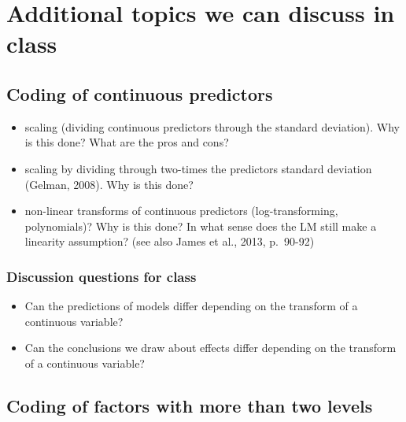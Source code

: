 \documentclass[
]{article}
\providecommand{\tightlist}{%
  \setlength{\itemsep}{0pt}\setlength{\parskip}{0pt}}
\begin{document}
\hypertarget{additional-topics-we-can-discuss-in-class}{%
\section{Additional topics we can discuss in
class}\label{additional-topics-we-can-discuss-in-class}}

\hypertarget{coding-of-continuous-predictors}{%
\subsection{Coding of continuous
predictors}\label{coding-of-continuous-predictors}}

\begin{itemize}
\tightlist
\item
  scaling (dividing continuous predictors through the standard
  deviation). Why is this done? What are the pros and cons?
\item
  scaling by dividing through two-times the predictors standard
  deviation (Gelman, 2008). Why is this done?
\item
  non-linear transforms of continuous predictors (log-transforming,
  polynomials)? Why is this done? In what sense does the LM still make a
  linearity assumption? (see also James et al., 2013, p.~90-92)
\end{itemize}

\hypertarget{discussion-questions-for-class-3}{%
\subsubsection{Discussion questions for
class}\label{discussion-questions-for-class-3}}

\begin{itemize}
\tightlist
\item
  Can the predictions of models differ depending on the transform of a
  continuous variable?
\item
  Can the conclusions we draw about effects differ depending on the
  transform of a continuous variable?
\end{itemize}

\hypertarget{coding-of-factors-with-more-than-two-levels}{%
\subsection{Coding of factors with more than two
levels}\label{coding-of-factors-with-more-than-two-levels}}

\footnotesize
\end{document}
